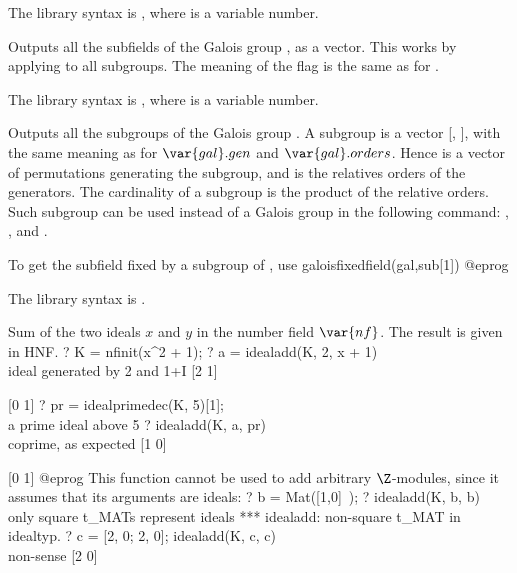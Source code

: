 The library syntax is , where  is a variable number.

\label{se:galoissubfields}
Outputs all the subfields of the Galois group , as a vector.
This works by applying  to all subgroups. The meaning of
the flag  is the same as for .

The library syntax is , where  is a variable number.

\label{se:galoissubgroups}
Outputs all the subgroups of the Galois group . A subgroup is a
vector [, ], with the same meaning
as for $\var{gal}.gen$ and $\var{gal}.orders$. Hence  is a vector of
permutations generating the subgroup, and  is the relatives
orders of the generators. The cardinality of a subgroup is the product of the
relative orders. Such subgroup can be used instead of a Galois group in the
following command: , ,
 and .

To get the subfield fixed by a subgroup  of , use
\bprog
galoisfixedfield(gal,sub[1])
@eprog

The library syntax is .

\label{se:idealadd}
Sum of the two ideals $x$ and $y$ in the number field $\var{nf}$. The
result is given in HNF.
\bprog
 ? K = nfinit(x^2 + 1);
 ? a = idealadd(K, 2, x + 1)  \\ ideal generated by 2 and 1+I
 [2 1]

 [0 1]
 ? pr = idealprimedec(K, 5)[1];  \\ a prime ideal above 5
 ? idealadd(K, a, pr)     \\ coprime, as expected
 [1 0]

 [0 1]
@eprog\noindent
This function cannot be used to add arbitrary $\Z$-modules, since it assumes
that its arguments are ideals:
\bprog
  ? b = Mat([1,0]~);
  ? idealadd(K, b, b)     \\ only square t_MATs represent ideals
  *** idealadd: non-square t_MAT in idealtyp.
  ? c = [2, 0; 2, 0]; idealadd(K, c, c)   \\ non-sense
  [2 0]

